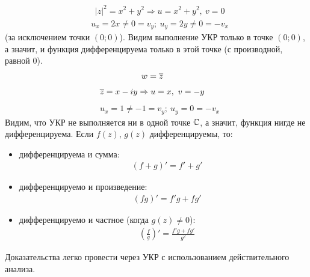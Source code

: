 \begin{align*}
  & \left| z \right|^2 = x^2+y^2 \Rightarrow u = x^2+y^2, \ v = 0
\end{align*}
\begin{align*}
  & u_x = 2x \neq 0 = v_y; \ u_y = 2y \neq 0 = - v_x
\end{align*}
(за исключением точки $(0;0)$). Видим выполнение УКР только в точке $(0;0)$, а
значит, и функция дифференцируема только в этой точке (с производной, равной
$0$).
\Example
\begin{align*}
  & w = \overline{z}
\end{align*}
\begin{align*}
  & \overline{z} = x - iy \Rightarrow u = x, \ v = -y
\end{align*}
\begin{align*}
  & u_x = 1 \neq -1 = v_y; \ u_y = 0 = - v_x
\end{align*}
Видим, что УКР не выполняется ни в одной точке $\mathbb{C}$, а значит, функция нигде не
дифференцируема.
\prop
Если $f(z)$, $g(z)$ дифференцируемы, то:
\begin{itemize}
    \item дифференцируема и сумма:
    \begin{align*}
      & \left( f+g \right)' = f'+g'
    \end{align*}
    \item дифференцируемо и произведение:
    \begin{align*}
      & \left( fg \right)' = f'g+fg'
    \end{align*}
    \item дифференцируемо и частное (когда $g(z) \neq 0$):
    \begin{align*}
      & \left( \frac{f}{g} \right)' = \frac{f'g+fg'}{g^2}
    \end{align*}
\end{itemize}
\pr
Доказательства легко провести через УКР с использованием действительного
анализа.

